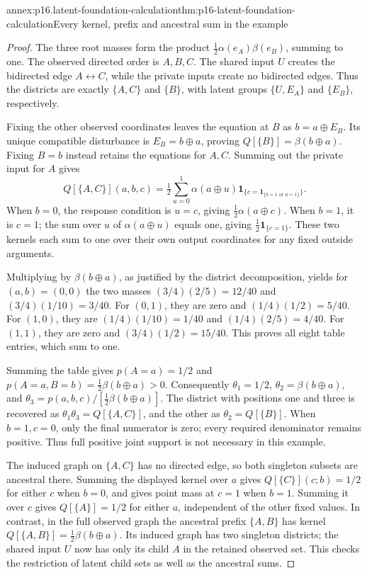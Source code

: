 \begin{annexitem}{annex:p16.latent-foundation-calculation}{thm:p16-latent-foundation-calculation}{Every kernel, prefix and ancestral sum in the example}
\begin{proof}
The three root masses form the product
\(\frac12\alpha(e_A)\beta(e_B)\), summing to one. The observed
directed order is \(A,B,C\). The shared input \(U\) creates
the bidirected edge \(A\leftrightarrow C\), while the private
inputs create no bidirected edges. Thus the districts are exactly
\(\{A,C\}\) and \(\{B\}\), with latent groups
\(\{U,E_A\}\) and \(\{E_B\}\), respectively.

Fixing the other observed coordinates leaves the equation at \(B\)
as \(b=a\oplus E_B\). Its unique compatible disturbance is
\(E_B=b\oplus a\), proving \(Q[\{B\}]=\beta(b\oplus a)\).
Fixing \(B=b\) instead retains the equations for \(A,C\).
Summing out the private input for \(A\) gives
\[
 Q[\{A,C\}](a,b,c)=
 \tfrac12\sum_{u=0}^1\alpha(a\oplus u)
             \mathbf1_{\{c=\mathbf1_{\{b=1\text{ or }u=1\}}\}}.
\]
When \(b=0\), the response condition is \(u=c\), giving
\(\frac12\alpha(a\oplus c)\). When \(b=1\), it is
\(c=1\); the sum over \(u\) of \(\alpha(a\oplus u)\)
equals one, giving \(\frac12\mathbf1_{\{c=1\}}\).
These two kernels each sum to one over their own output coordinates
for any fixed outside arguments.

Multiplying by \(\beta(b\oplus a)\), as justified by the
district decomposition, yields for \((a,b)=(0,0)\) the two
masses \((3/4)(2/5)=12/40\) and \((3/4)(1/10)=3/40\).
For \((0,1)\), they are zero and \((1/4)(1/2)=5/40\).
For \((1,0)\), they are \((1/4)(1/10)=1/40\) and
\((1/4)(2/5)=4/40\). For \((1,1)\), they are zero and
\((3/4)(1/2)=15/40\). This proves all eight table entries,
which sum to one.

Summing the table gives \(p(A=a)=1/2\) and
\(p(A=a,B=b)=\frac12\beta(b\oplus a)>0\). Consequently
\(\theta_1=1/2\), \(\theta_2=\beta(b\oplus a)\), and
\(\theta_3=p(a,b,c)/[\frac12\beta(b\oplus a)]\).
The district with positions one and three is recovered as
\(\theta_1\theta_3=Q[\{A,C\}]\), and the other as
\(\theta_2=Q[\{B\}]\). When \(b=1,c=0\), only the final
numerator is zero; every required denominator remains positive.
Thus full positive joint support is not necessary in this example.

The induced graph on \(\{A,C\}\) has no directed edge, so
both singleton subsets are ancestral there. Summing the displayed
kernel over \(a\) gives \(Q[\{C\}](c;b)=1/2\) for either
\(c\) when \(b=0\), and gives point mass at \(c=1\) when
\(b=1\). Summing it over \(c\) gives \(Q[\{A\}]=1/2\)
for either \(a\), independent of the other fixed values.
In contrast, in the full observed graph the ancestral prefix
\(\{A,B\}\) has kernel
\(Q[\{A,B\}]=\frac12\beta(b\oplus a)\). Its induced graph
has two singleton districts; the shared input \(U\) now has
only its child \(A\) in the retained observed set. This checks
the restriction of latent child sets as well as the ancestral sums.
\end{proof}
\end{annexitem}

